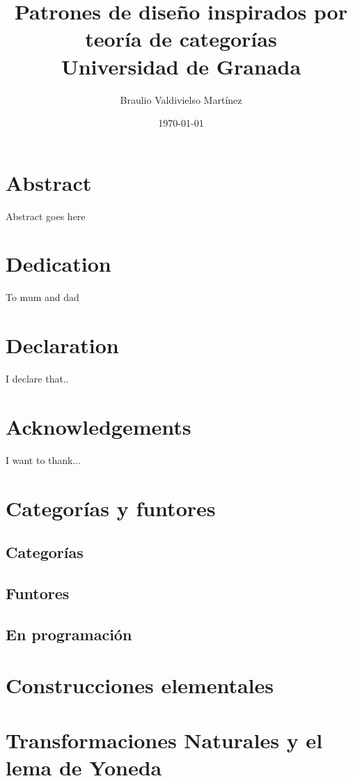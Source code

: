 \documentclass[12pt]{report}
\title{
	{Patrones de diseño inspirados por teoría de categorías}\\
	{\large Universidad de Granada}\\
}
\author{Braulio Valdivielso Martínez}
\date{\today}
\begin{document}
\maketitle

\chapter*{Abstract}
Abstract goes here

\chapter*{Dedication}
To mum and dad

\chapter*{Declaration}
I declare that..

\chapter*{Acknowledgements}
I want to thank...

\tableofcontents

\chapter{Categorías y funtores}
\section{Categorías}

\section{Funtores}

\section{En programación}


\chapter{Construcciones elementales}


\chapter{Transformaciones Naturales y el lema de Yoneda}
\end{document}
